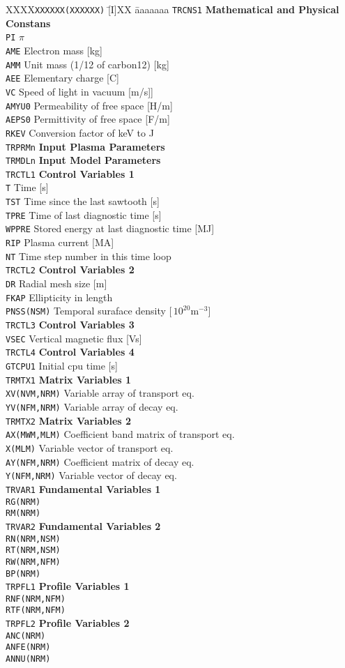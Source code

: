 \documentclass[11pt]{jarticle}
\def\r#1{\mathrm{#1}}
\def\unit#1{\,\r{#1}}
\renewcommand{\title}[1]{\begin{center}\fboxsep=3mm\fbox{\textbf{#1}}\end{center}}
\newcommand{\commonVarLine}
{XXXX\= \texttt{XXXXXX(XXXXXX)} \= [I]XX \= aaaaaaa\kill}
\newcommand{\commonBlock}[2]
{\texttt{#1} \> \> \> \textbf{#2} \\}
\newcommand{\commonVar}[3]
{\> \texttt{#1} \> [#2] \> #3 \\}
\begin{document}
\title{Common Variables}
\begin{tabbing}
\commonVarLine
\commonBlock{TRCNS1}{Mathematical and Physical Constans}
\commonVar{PI}{D}{$\pi$}
\commonVar{AME}{D}{Electron mass [kg]}
\commonVar{AMM}{D}{Unit mass (1/12 of carbon12) [kg]}
\commonVar{AEE}{D}{Elementary charge [C]}
\commonVar{VC}{D}{Speed of light in vacuum [m/s]]}
\commonVar{AMYU0}{D}{Permeability of free space [H/m]}
\commonVar{AEPS0}{D}{Permittivity of free space [F/m]}
\commonVar{RKEV}{D}{Conversion factor of keV to J}

\commonBlock{TRPRMn}{Input Plasma Parameters}
\commonBlock{TRMDLn}{Input Model Parameters}

\commonBlock{TRCTL1}{Control Variables 1}
\commonVar{T}{D}{Time [s]}
\commonVar{TST}{D}{Time since the last sawtooth [s]}
\commonVar{TPRE}{D}{Time of last diagnostic time [s]}
\commonVar{WPPRE}{D}{Stored energy at last diagnostic time [MJ]}
\commonVar{RIP}{D}{Plasma current [MA]}
\commonVar{NT}{I}{Time step number in this time loop}

\commonBlock{TRCTL2}{Control Variables 2}
\commonVar{DR}{D}{Radial mesh size [m]}
\commonVar{FKAP}{D}{Ellipticity in length}
\commonVar{PNSS(NSM)}{D}{Temporal suraface density [$\unit{10^{20}m^{-3}}$]}

\commonBlock{TRCTL3}{Control Variables 3}
\commonVar{VSEC}{D}{Vertical magnetic flux [Vs]}

\commonBlock{TRCTL4}{Control Variables 4}
\commonVar{GTCPU1}{S}{Initial cpu time [s]}

\commonBlock{TRMTX1}{Matrix Variables 1}
\commonVar{XV(NVM,NRM)}{D}{Variable array of transport eq.}
\commonVar{YV(NFM,NRM)}{D}{Variable array of decay eq.}

\commonBlock{TRMTX2}{Matrix Variables 2}
\commonVar{AX(MWM,MLM)}{D}{Coefficient band matrix of transport eq.}
\commonVar{X(MLM)}{D}{Variable vector of transport eq.}
\commonVar{AY(NFM,NRM)}{D}{Coefficient matrix of decay eq.}
\commonVar{Y(NFM,NRM)}{D}{Variable vector of decay eq.}


\commonBlock{TRVAR1}{Fundamental Variables 1}
\commonVar{RG(NRM)}{D}{}
\commonVar{RM(NRM)}{D}{}

\commonBlock{TRVAR2}{Fundamental Variables 2}
\commonVar{RN(NRM,NSM)}{D}{}
\commonVar{RT(NRM,NSM)}{D}{}
\commonVar{RW(NRM,NFM)}{D}{}
\commonVar{BP(NRM)}{D}{}

\commonBlock{TRPFL1}{Profile Variables 1}
\commonVar{RNF(NRM,NFM)}{D}{}
\commonVar{RTF(NRM,NFM)}{D}{}

\commonBlock{TRPFL2}{Profile Variables 2}
\commonVar{ANC(NRM)}{D}{}
\commonVar{ANFE(NRM)}{D}{}
\commonVar{ANNU(NRM)}{D}{}


\end{tabbing}
\end{document}
